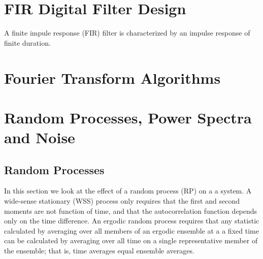 \documentclass[11pt]{book}
\theoremstyle{example}
\begin{document}
\section{FIR Digital Filter Design}

A finite impule response (FIR) filter is characterized by an impulse response of finite duration.

\section{Fourier Transform Algorithms}

\section{Random Processes, Power Spectra and Noise}

\subsection{Random Processes}

In this section we look at the effect of a random process (RP) on a a system. A wide-sense stationary (WSS) process only requires that the first and second moments are not function of time, and that the autocorrelation function depends only on the time difference. An ergodic random process requires that any statistic calculated by averaging over all members of an ergodic ensemble at a a fixed time can be calculated by averaging over all time on a single representative member of the ensemble; that is, time averages equal ensemble averages.
\end{document}
